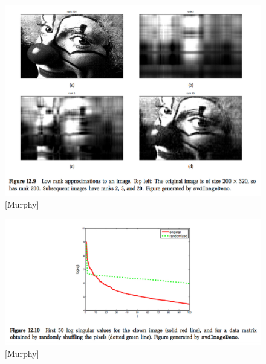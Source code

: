 \documentclass[a4paper]{article}
\begin{document}
\begin{figure}
\centering
\includegraphics[width=1.0\textwidth]{clown_example.png}
\caption{\label{fig:clown_example}[Murphy]}
\end{figure}

\begin{figure}
\centering
\includegraphics[width=1.0\textwidth]{sval_plot.png}
\caption{\label{fig:sval_plot}[Murphy]}
\end{figure}
\end{document}
